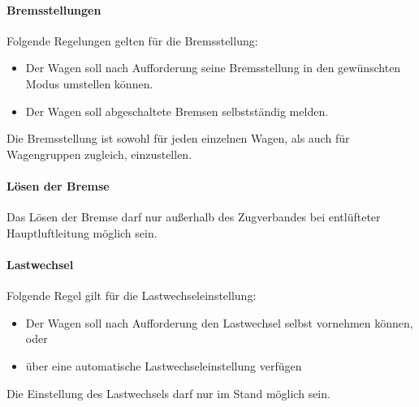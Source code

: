 \paragraph{Bremsstellungen}
\begin{feat}
Folgende Regelungen gelten für die Bremsstellung:
\begin{itemize}
    \item Der Wagen soll nach Aufforderung seine Bremsstellung in den gewünschten Modus umstellen können.
    \item Der Wagen soll abgeschaltete Bremsen selbstständig melden.
\end{itemize}
\end{feat}
\begin{rem} [zu Anf. 46]
Die Bremsstellung ist sowohl für jeden einzelnen Wagen, als auch für Wagengruppen zugleich, einzustellen.
\end{rem}

\paragraph{Lösen der Bremse}
\begin{feat}
Das Lösen der Bremse darf nur außerhalb des \gls{Zugverband}es bei entlüfteter Hauptluftleitung möglich sein.
\end{feat}

\paragraph{Lastwechsel}
\begin{feat}
Folgende Regel gilt für die \gls{Lastwechsel}einstellung:
\begin{itemize}
    \item Der Wagen soll nach Aufforderung den \gls{Lastwechsel} selbst vornehmen können, oder
    \item über eine automatische \gls{Lastwechsel}einstellung verfügen
\end{itemize}
\end{feat}
\begin{feat}
Die Einstellung des Lastwechsels darf nur im Stand möglich sein.
\end{feat}

